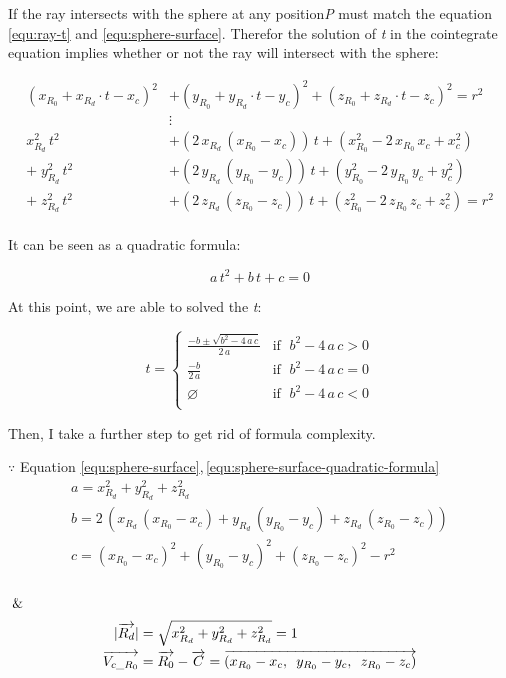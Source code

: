 If the ray intersects with the sphere at any position\;\emph{P} must match the equation \ref{equ:ray-t} and \ref{equ:sphere-surface}. Therefor the solution of \emph{t} in the cointegrate equation implies whether or not the ray will intersect with the sphere:

\[
\begin{aligned}
(x_{R_0} + x_{R_d} \cdot t - x_c)^2 &+ (y_{R_0} + y_{R_d} \cdot t - y_c)^2 + (z_{R_0} + z_{R_d} \cdot t - z_c)^2 = r^2\\
&\vdots\\
x_{R_d}^2\,t^2 &+ (2\,x_{R_d}\,(x_{R_0} - x_c))\,t + (x_{R_0}^2 - 2\,x_{R_0}\,x_c + x_c^2)\\
+\;y_{R_d}^2\,t^2 &+ (2\,y_{R_d}\,(y_{R_0} - y_c))\,t + (y_{R_0}^2 - 2\,y_{R_0}\,y_c + y_c^2)\\
+\;z_{R_d}^2\,t^2 &+ (2\,z_{R_d}\,(z_{R_0} - z_c))\,t + (z_{R_0}^2 - 2\,z_{R_0}\,z_c + z_c^2) = r^2\\
\end{aligned}
\]

It can be seen as a quadratic formula:

\begin{equation}
\label{equ:sphere-surface-quadratic-formula}
a\,t^2 + b\,t + c = 0
\end{equation}

At this point, we are able to solved the \emph{t}:

\[
t =
\begin{cases}
\frac{-b \pm \sqrt{b^2 - 4\,a\,c}}{2\,a} & \text{if }\;b^2 - 4\,a\,c > 0\\
\frac{-b}{2\,a} & \text{if }\; b^2 - 4\,a\,c = 0\\
\varnothing & \text{if }\; b^2 - 4\,a\,c < 0\\
\end{cases}
\]

Then, I take a further step to get rid of formula complexity.

$\because$ Equation \ref{equ:sphere-surface},\,\ref{equ:sphere-surface-quadratic-formula}
\[
\begin{array}{lr}
a = x_{R_d}^2 + y_{R_d}^2 + z_{R_d}^2\\
b = 2\,(x_{R_d}\,(x_{R_0} - x_c) + y_{R_d}\,(y_{R_0} - y_c) + z_{R_d}\,(z_{R_0} - z_c))\\
c = (x_{R_0} - x_c)^2 + (y_{R_0} - y_c)^2 + (z_{R_0} - z_c)^2 - r^2\\
\end{array}
\]

$\And$
\[
\begin{array}{lr}
\begin{aligned}
\lvert \overrightarrow{R_d} \rvert &= \sqrt{x_{R_d}^2 + y_{R_d}^2 + z_{R_d}^2} = 1\\
\overrightarrow{V_{c\_R_0}} &= \overrightarrow{R_0} - \overrightarrow{C} = \overrightarrow{(x_{R_0} - x_c,\enspace y_{R_0} - y_c,\enspace z_{R_0} - z_c)}\\
\end{aligned}
\end{array}
\]

